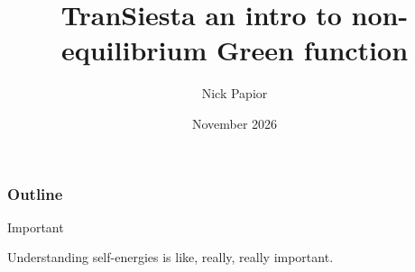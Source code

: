 

\graphicspath{{fig/}{../fig/}{../01/fig/}}
\usepackage[export]{adjustbox}


\date{November 2026}
\title{TranSiesta an intro to non-equilibrium Green function}
\author{Nick Papior}




\begin{frame}
  \titlepage
\end{frame}

\begin{frame}
  \frametitle{Outline}
  \tableofcontents
\end{frame}

\showbondcurrentfalse
\showdensitymatrixweighingfalse
\showintromotivationfalse
\showintrotbtnterminalfalse
\shownegftransmissionfalse




\begin{frame}

  \vfill

  \centering
  \begin{minipage}{.7\linewidth}

  \begin{block}{Important}

    Understanding self-energies is like, really, really important.

  \end{block}

  \end{minipage}

  \vfill
\end{frame}




